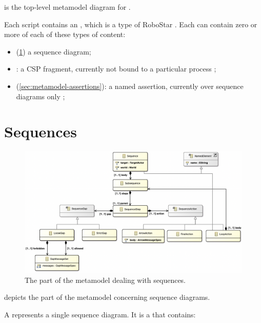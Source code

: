  is the top-level metamodel diagram for \langname.

Each \langname{} script contains an \mrapackage, which is a type of RoboStar
\mbasicpackage.  Each \mrapackage{} can contain zero or more of each of these
types of content:

\begin{itemize}
\item
	\msequence{}
	(\cref{sec:metamodel-sequences})
	a sequence diagram;
\item
	\mcspfragment:
	a CSP fragment, currently not bound to a particular process
	;
\item
	\mnamedassertion{}
	(\cref{sec:metamodel-assertions}):
	a named assertion, currently over sequence diagrams only
	;
\end{itemize}



\section{Sequences}\label{sec:metamodel-sequences}

\begin{figure}
	\centering
	\includegraphics[width=\textwidth]{diagrams/sequences.png}
	\caption{The part of the \langname{} metamodel dealing with sequences.}
	\label{fig:metamodel-sequences}
\end{figure}

 depicts the part of the metamodel concerning
sequence diagrams.

A \msequence{} represents a single sequence diagram.  It is a \mnamedelement{}
that contains:

